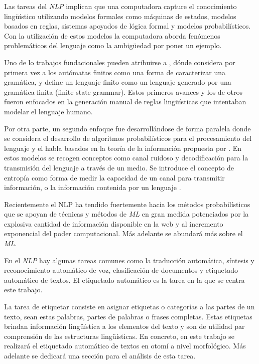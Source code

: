 \documentclass[letterpaper,12pt,oneside]{book}
\theoremstyle{definition}
\begin{document}
Las tareas del \textit{NLP} implican que una computadora capture el conocimiento lingüístico utilizando modelos formales como máquinas de estados, modelos basados en reglas, sistemas apoyados de lógica formal y modelos probabilísticos. Con la utilización de estos modelos la computadora aborda fenómenos problemáticos del lenguaje como la ambigüedad por poner un ejemplo.

Uno de lo trabajos fundacionales pueden atribuirse a \citet{chomsky1956three}, dónde considera por primera vez a los autómatas finitos como una forma de caracterizar una gramática, y define un lenguaje finito como un lenguaje generado por una gramática finita (finite-state grammar). Estos primeros avances y los de otros fueron enfocados en la generación manual de reglas lingüísticas que intentaban modelar el lenguaje humano.

Por otra parte, un segundo enfoque fue desarrollándose de forma paralela donde se considera el desarrollo de algoritmos probabilísticos para el procesamiento del lenguaje y el habla basados en la teoría de la información propuesta por \citet{shannon1948mathematical}. En estos modelos se recogen conceptos como canal ruidoso y decodificación para la transmisión del lenguaje a través de un medio. Se introduce el concepto de entropía como forma de medir la capacidad de un canal para transmitir información, o la información contenida por un lenguaje \citep{jurafsky2008speech}.

Recientemente el NLP ha tendido fuertemente hacia los métodos probabilísticos que se apoyan de técnicas y métodos de \textit{ML} en gran medida potenciados por la explosiva cantidad de información disponible en la web y al incremento exponencial del poder computacional. Más adelante se abundará más sobre el \textit{ML}.

En el \textit{NLP} hay algunas tareas comunes como la traducción automática, síntesis y reconocimiento automático de voz, clasificación de documentos y etiquetado automático de textos. El etiquetado automático es la tarea en la que se centra este trabajo. 

La tarea de etiquetar consiste en asignar etiquetas o categorías a las partes de un texto, sean estas palabras, partes de palabras o frases completas. Estas etiquetas brindan información lingüística a los elementos del texto y son de utilidad par comprensión de las estructuras lingüísticas. En concreto, en este trabajo se realizará el etiquetado automático de textos en otomí a nivel morfológico. Más adelante se dedicará una sección para el análisis de esta tarea.
\end{document}
